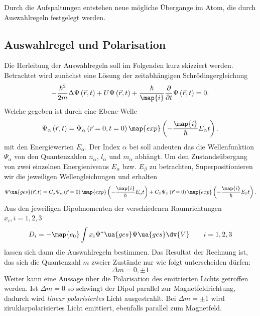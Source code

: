 Durch die Aufspaltungen entstehen neue mögliche Übergange im Atom, die durch Auswahlregeln festgelegt werden.

\subsection{Auswahlregel und Polarisation}
Die Herleitung der Auswahlregeln soll im Folgenden kurz skizziert werden.
Betrachtet wird zunächst eine Lösung der zeitabhängigen Schrödingergleichung
\begin{equation}
  \label{eq:s_gleichung}
  -\frac{\hbar^2}{2m}\Delta \Psi\left(\vec{r},t\right) + U  \Psi\left(\vec{r},t\right) + \frac{\hbar}{\map{i}} \frac{\partial}{\partial t}  \Psi\left(\vec{r},t\right)=0.
\end{equation}
Welche gegeben ist durch eine Ebene-Welle
\begin{equation*}
  \Psi_{\alpha}\left(\vec{r},t\right)=\Psi_{\alpha}\left(\vec{r}=0,t=0\right)\map{exp}\left(-\frac{\map{i}}{\hbar}E_\alpha t\right).
\end{equation*}
mit den Energiewerten $E_\alpha$. Der Index $\alpha$ bei soll andeuten das die Wellenfunktion
$\Psi_\alpha$ von den Quantenzahlen $n_\alpha$, $l_\alpha$ und $m_\alpha$ abhängt.
Um den Zustandsübergang von zwei einzelnen Energieniveaus $E_\alpha$ bzw. $E_\beta$ zu betrachten,
Superpositionieren wir die jeweiligen Wellengleichungen und erhalten
\begin{equation*}
    \Psi\ua{ges}(\vec{r},t)=C_\alpha\Psi_{\alpha}\left(\vec{r}=0\right)\map{exp}\left(-\frac{\map{i}}{\hbar}E_\alpha t\right)+C_\beta\Psi_{\beta}\left(\vec{r}=0\right)\map{exp}\left(-\frac{\map{i}}{\hbar}E_\beta t\right).
\end{equation*}
Aus den jeweiligen Dipolmomenten der verschiedenen Raumrichtungen $x_i, i=1,2,3$
\begin{equation*}
  D_i=-\map{e_0}\int x_i \Psi^*\ua{ges}\Psi\ua{ges} \dv{V} \qquad i=1,2,3
\end{equation*}
lassen sich dann die Auswahlregeln bestimmen.
Das Resultat der Rechnung ist, das sich die Quantenzahl $m$ zweier Zustände
nur wie folgt unterscheiden dürfen:
\begin{equation}
  \label{eq:auswahlregeln}
  \Delta m=0 , \pm 1
\end{equation}
Weiter kann eine Aussage über die Polarisation des emittierten Lichts getroffen werden.
Ist $\Delta m=0$ so schwingt der Dipol parallel zur Magnetfeldrichtung, dadurch wird \emph{linear polarisiertes} Licht
ausgestrahlt. Bei $\Delta m=\pm 1$ wird ziruklarpolarisiertes Licht emittiert, ebenfalls parallel zum Magnetfeld.

